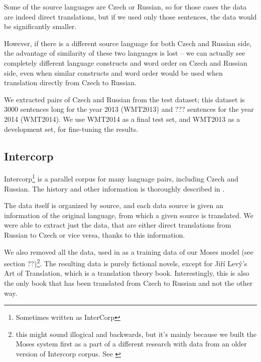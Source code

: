 Some of the source languages are Czech or Russian, so for those cases the data are indeed direct translations, but if we used only those sentences, the data would be significantly smaller.

However, if there is a different source language for both Czech and Russian side, the advantage of similarity of these two languages is lost -- we can actually see completely different language constructs and word order on Czech and Russian side, even when similar constructs and word order would be used when translation directly from Czech to Russian.

We extracted pairs of Czech and Russian from the test dataset; this dataset is 3000 sentences long for the year 2013 (WMT2013) and ??? sentences for the year 2014 (WMT2014). We use WMT2014 as a final test set, and WMT2013 as a development set, for fine-tuning the results.


\subsection{Intercorp}

Intercorp\footnote{Sometimes written as InterCorp} is a parallel corpus for many language pairs, including Czech and Russian. The history and other information is thoroughly described in \cite{intercorp}. 

The data itself is organized by source, and each data source is given an information of the original language, from which a given source is translated. We were able to extract just the data, that are either direct translations from Russian to Czech or vice versa, thanks to this information.

We also removed all the data, used in as a training data of our Moses model (see section ??)\footnote{this might sound illogical and backwards, but it's mainly because we built the Moses system first as a part of a different research with data from an older version of Intercorp corpus. See \cite{mujpaper}}. The resulting data is purely fictional novels, except for Jiří Levý's Art of Translation, which is a translation theory book. Interestingly, this is also the only book that has been translated from Czech to Russian and not the other way.

